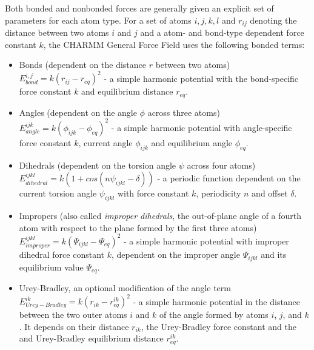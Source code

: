 \documentclass[oneside]{scrreprt}
\begin{document}
Both bonded and nonbonded forces are generally given an explicit set of parameters for each atom type. For a set of atoms $i,j,k,l$ and $r_{ij}$ denoting the distance between two atoms $i$ and $j$ and a atom- and bond-type dependent force constant $k$, the CHARMM General Force Field\cite{vanommeslaeghe_charmm_2010} uses the following bonded terms:
\begin{itemize}
    \item Bonds (dependent on the distance $r$ between two atoms)\\
    
    $E_{bond}^{i,j}=k(r_{ij}-r_{eq})^2$ - a simple harmonic potential with the bond-specific force constant $k$ and equilibrium distance $r_{eq}$.
    \item Angles (dependent on the angle $\phi$ across three atoms)\\
    
    $E_{angle}^{ijk}=k(\phi_{ijk}-\phi_{eq})^2$ - a simple harmonic potential with angle-specific force constant $k$, current angle $\phi_{ijk}$ and equilibrium angle $\phi_{eq}$.
    \item Dihedrals (dependent on the torsion angle $\psi$ across four atoms)\\
    
    $E_{dihedral}^{ijkl}=k (1+cos(n\psi_{ijkl}-\delta))$ - a periodic function dependent on the current torsion angle $\psi_{ijkl}$ with force constant $k$, periodicity $n$ and offset $\delta$.
    \item Impropers (also called \emph{improper dihedrals}, the out-of-plane angle of a fourth atom with respect to the plane formed by the first three atoms)\\
    
    $E_{improper}^{ijkl}=k(\Psi_{ijkl}-\Psi_{eq})^2$ - a simple harmonic potential with improper dihedral force constant $k$, dependent on the improper angle $\Psi_{ijkl}$ and its equilibrium value $\Psi_{eq}$.
    
    \item Urey-Bradley, an optional modification of the angle term\\
    
    $E_{Urey-Bradley}^{ik}=k(r_{ik}-r^{ik}_{eq})^2$ - a simple harmonic potential in the distance between the two outer atoms $i$ and $k$ of the angle formed by atoms $i$, $j$, and $k$. It depends on their distance $r_{ik}$, the Urey-Bradley force constant and the and Urey-Bradley equilibrium distance $r^{ik}_{eq}$.
\end{itemize}
\end{document}
